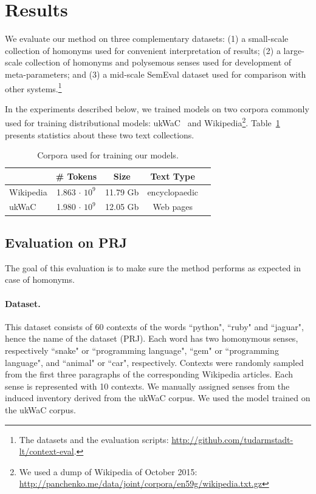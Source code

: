\documentclass[11pt]{article}
\begin{document}
\section{Results}

We evaluate our method on three complementary datasets: (1) a small-scale collection of homonyms used for convenient interpretation of results; (2) a large-scale collection of homonyms and polysemous senses used for development of meta-parameters; and (3) a  mid-scale SemEval dataset used for comparison with other systems.\footnote{The datasets and the evaluation scripts: \url{http://github.com/tudarmstadt-lt/context-eval}.} 

In the experiments described below, we trained models on two corpora commonly used for training distributional models: ukWaC~\cite{ferraresi2008introducing} and Wikipedia\footnote{We used a dump of Wikipedia of October 2015: \url{http://panchenko.me/data/joint/corpora/en59g/wikipedia.txt.gz}}. Table~\ref{tbl:corpora} presents statistics about these two text collections.

\begin{table}
\footnotesize
\centering
\begin{tabular}{lcccc}
  \toprule          
  &  \bf   \# Tokens & \bf  Size & \bf Text Type \\ \midrule          
  Wikipedia & 1.863 $\cdot$ $10^9$ & 11.79 Gb & encyclopaedic \\
  ukWaC & 1.980 $\cdot$ $10^9$ &  12.05 Gb & Web pages \\
  \bottomrule  
\end{tabular}
\caption{Corpora used for training our models.}
\label{tbl:corpora}
\end{table}
   

\subsection{Evaluation on PRJ }
The goal of this evaluation is to make sure the method performs as expected in case of homonyms. %

\paragraph{Dataset.} 
This dataset consists of 60 contexts of the words ``python", ``ruby" and ``jaguar", hence the name of the dataset (PRJ). Each word has two homonymous senses, respectively ``snake" or ``programming language", ``gem" or ``programming language", and ``animal" or ``car", respectively. Contexts were randomly sampled from the first three paragraphs of the corresponding Wikipedia articles. Each sense is represented with 10 contexts. We manually assigned senses from the  induced inventory derived from the ukWaC corpus. We used the model trained on the ukWaC corpus. 
\end{document}
